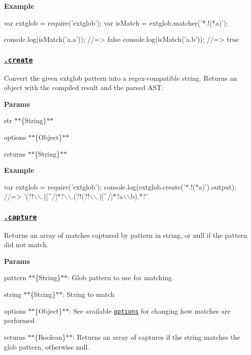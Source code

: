 {\bfseries Example}


\begin{DoxyCode}
var extglob = require('extglob');
var isMatch = extglob.matcher('*.!(*a)');

console.log(isMatch('a.a'));
//=> false
console.log(isMatch('a.b'));
//=> true
\end{DoxyCode}


\subsubsection*{\href{index.js#L214}{\tt .create}}

Convert the given {\ttfamily extglob} pattern into a regex-\/compatible string. Returns an object with the compiled result and the parsed A\+ST.

{\bfseries Params}


\begin{DoxyItemize}
\item {\ttfamily str} $\ast$$\ast$\{String\}$\ast$$\ast$
\item {\ttfamily options} $\ast$$\ast$\{Object\}$\ast$$\ast$
\item {\ttfamily returns} $\ast$$\ast$\{String\}$\ast$$\ast$
\end{DoxyItemize}

{\bfseries Example}


\begin{DoxyCode}
var extglob = require('extglob');
console.log(extglob.create('*.!(*a)').output);
//=> '(?!\(\backslash\)\(\backslash\).)[^/]*?\(\backslash\)\(\backslash\).(?!(?!\(\backslash\)\(\backslash\).)[^/]*?a\(\backslash\)\(\backslash\)b).*?'
\end{DoxyCode}


\subsubsection*{\href{index.js#L248}{\tt .capture}}

Returns an array of matches captured by {\ttfamily pattern} in {\ttfamily string}, or {\ttfamily null} if the pattern did not match.

{\bfseries Params}


\begin{DoxyItemize}
\item {\ttfamily pattern} $\ast$$\ast$\{String\}$\ast$$\ast$\+: Glob pattern to use for matching.
\item {\ttfamily string} $\ast$$\ast$\{String\}$\ast$$\ast$\+: String to match
\item {\ttfamily options} $\ast$$\ast$\{Object\}$\ast$$\ast$\+: See available \href{#options}{\tt options} for changing how matches are performed
\item {\ttfamily returns} $\ast$$\ast$\{Boolean\}$\ast$$\ast$\+: Returns an array of captures if the string matches the glob pattern, otherwise {\ttfamily null}.
\end{DoxyItemize}

